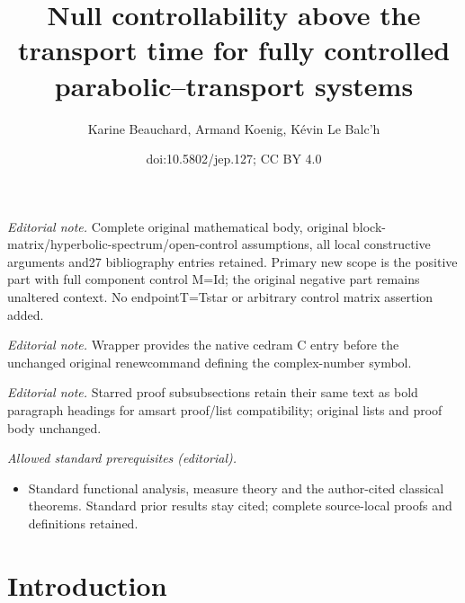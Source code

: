 \documentclass[10pt]{amsart}
\title{Null controllability above the transport time for fully controlled parabolic–transport systems}
\author{Karine Beauchard, Armand Koenig, Kévin Le Balc'h}
\date{doi:10.5802/jep.127; CC BY 4.0}
\theoremstyle{plain}
\theoremstyle{definition}
\theoremstyle{remark}
\begin{document}
\maketitle
\noindent\textit{Editorial note.} Complete original mathematical body, original block-matrix/hyperbolic-spectrum/open-control assumptions, all local constructive arguments and27 bibliography entries retained. Primary new scope is the positive part with full component control M=Id; the original negative part remains unaltered context. No endpointT=Tstar or arbitrary control matrix assertion added.\par\medskip
\noindent\textit{Editorial note.} Wrapper provides the native cedram C entry before the unchanged original renewcommand defining the complex-number symbol.\par\medskip
\noindent\textit{Editorial note.} Starred proof subsubsections retain their same text as bold paragraph headings for amsart proof/list compatibility; original lists and proof body unchanged.\par\medskip
\noindent\textit{Allowed standard prerequisites (editorial).}\begin{itemize}
\item Standard functional analysis, measure theory and the author-cited classical theorems. Standard prior results stay cited; complete source-local proofs and definitions retained.
\end{itemize}\medskip
\tableofcontents
\vspace*{-\baselineskip}\vskip0pt%


\section{Introduction}
\end{document}

